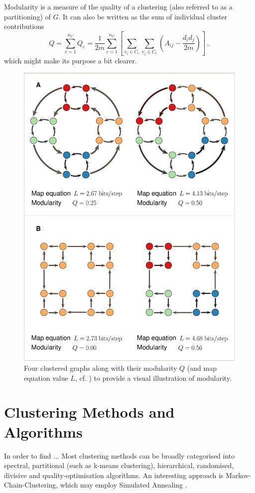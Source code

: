 \documentclass[12pt, a4paper]{article}
\begin{document}
  Modularity is a measure of the quality of a clustering (also referred to as a partitioning) of $G$. It can also be written as the sum of individual cluster contributions
  $$Q = \sum_{c=1}^{n_C} Q_c = \frac{1}{2m} \sum_{c=1}^{n_C} \left[\sum_{v_i \in C_c} \sum_{v_j \in C_c} \left(A_{ij} - \frac{d_i d_j}{2m}\right)\right]\,,$$
  which might make its purpose a bit clearer.

  \begin{figure}[H]
    \centering
    \includegraphics[width=0.5\linewidth]{figures/nice-modularity.eps}
    \caption{Four clustered graphs along with their modularity $Q$ (and map equation value $L$, cf. \cite{mapequation}) to provide a visual illustration of modularity.}
  \end{figure}

  \section{Clustering Methods and Algorithms}
  In order to find ...
  Most clustering methods can be broadly categorised into spectral, partitional (such as k-means clustering), hierarchical, randomised, divisive and quality-optimisation algorithms.
  An interesting approach is Markov-Chain-Clustering, which may employ Simulated Annealing \cite{fortunato}.
\end{document}
